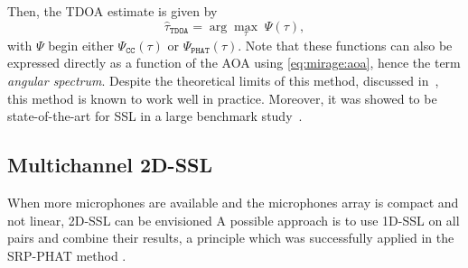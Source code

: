 \mynewline
Then, the \ac{TDOA} estimate is given by
\begin{equation*}
    \hat{\tau}_\mathtt{TDOA} = \arg \underset{\tau}{\max} \; \Psi(\tau)
    ,
\end{equation*}
with $\Psi$ begin either $\Psi_\mathtt{CC}(\tau)$ or $\Psi_\mathtt{PHAT}(\tau)$.
Note that these functions can also be expressed directly as a function of the \ac{AOA} using \eqref{eq:mirage:aoa}, hence the term \textit{angular spectrum}.
Despite the theoretical limits of this method, discussed in~, this method is known to work well in practice.
Moreover, it was showed to be state-of-the-art for \ac{SSL} in a large benchmark study~.

\subsection{Multichannel 2D-SSL}\label{subsec:mirage:2D-SSL}
When more microphones are available and the microphones array is compact and not linear, 2D-\ac{SSL} can be envisioned
A possible approach is to use 1D-\ac{SSL} on all pairs and combine their results, a principle which was successfully applied in the \acf{SRP-PHAT} method .


